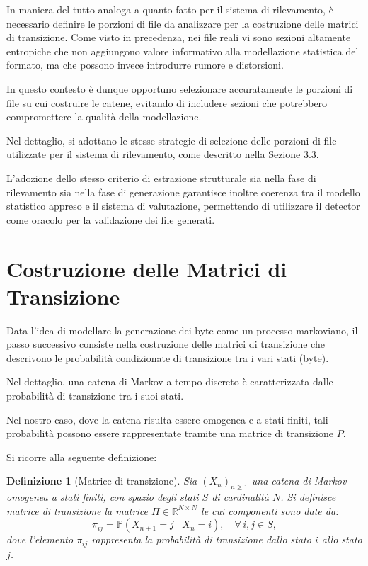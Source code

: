 \documentclass{report}
\newtheorem{definition}{Definizione}[chapter]
\begin{document}
In maniera del tutto analoga a quanto fatto per il sistema di rilevamento, è necessario definire
le porzioni di file da analizzare per la costruzione delle matrici di transizione.
Come visto in precedenza, nei file reali vi sono sezioni altamente entropiche che non aggiungono
valore informativo alla modellazione statistica del formato, ma che possono invece
introdurre rumore e distorsioni.

\bigskip

In questo contesto è dunque opportuno selezionare accuratamente le porzioni di file su cui 
costruire le catene, evitando di includere sezioni che potrebbero compromettere la qualità della
modellazione.

\bigskip

Nel dettaglio, si adottano le stesse strategie di selezione delle porzioni di file
utilizzate per il sistema di rilevamento, come descritto nella Sezione 3.3.

\bigskip

L’adozione dello stesso criterio di estrazione strutturale sia nella fase di
rilevamento sia nella fase di generazione garantisce inoltre coerenza tra il modello
statistico appreso e il sistema di valutazione, permettendo di utilizzare il
detector come oracolo per la validazione dei file generati.



\section{Costruzione delle Matrici di Transizione}

Data l'idea di modellare la generazione dei byte come un processo markoviano,
il passo successivo consiste nella costruzione delle matrici di transizione che
descrivono le probabilità condizionate di transizione tra i vari stati (byte).

Nel dettaglio, una catena di Markov a tempo discreto è caratterizzata dalle probabilità
di transizione tra i suoi stati.

Nel nostro caso, dove la catena risulta essere omogenea e a stati finiti, 
tali probabilità possono essere rappresentate tramite una matrice di transizione \(P\).

\bigskip

Si ricorre alla seguente definizione:

\begin{definition}[Matrice di transizione]
Sia \((X_n)_{n \geq 1}\) una catena di Markov omogenea a stati finiti, con spazio
degli stati \(S\) di cardinalità \(N\). Si definisce matrice di transizione la
matrice \(\Pi \in \mathbb{R}^{N \times N}\) le cui componenti sono date da:
\[
\pi_{ij} = \mathbb{P}(X_{n+1} = j \mid X_n = i),
\quad \forall\, i,j \in S,
\]
dove l’elemento
\(\pi_{ij}\) rappresenta la probabilità di transizione dallo stato \(i\) allo
stato \(j\).
\end{definition}
\end{document}
